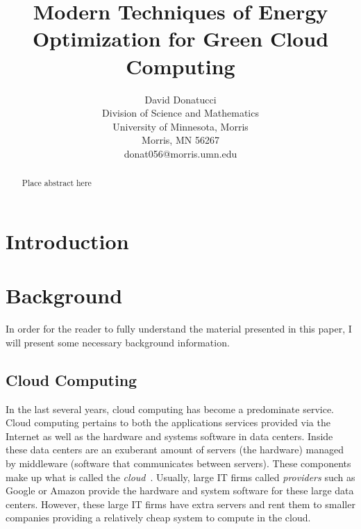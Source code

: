 \documentclass{sig-alternate}
\title{Modern Techniques of Energy Optimization for Green Cloud Computing}
\author{
\alignauthor
 		David Donatucci\\
        Division of Science and Mathematics\\
        University of Minnesota, Morris\\
        Morris, MN 56267\\
        donat056@morris.umn.edu\\
}
\date{}
\begin{document}
\pagestyle{plain}

\maketitle

\begin{abstract}

Place abstract here

\end{abstract}


\section{Introduction} \label{sec:intro}


\section{Background} \label{Background}

In order for the reader to fully understand the material presented in this paper, I will present some necessary background information.

\subsection{Cloud Computing}
\label{sec:Cloud Computing}

In the last several years, cloud computing has become a predominate service. Cloud computing pertains to both the applications services provided via the Internet as well as the hardware and systems software in data centers. Inside these data centers are an exuberant amount of servers (the hardware) managed by middleware (software that communicates between servers). These components make up what is called the \emph{cloud}~\cite{Armbrust}. Usually, large IT firms called \emph{providers} such as Google or Amazon provide the hardware and system software for these large data centers. However, these large IT firms have extra servers and rent them to smaller companies providing a relatively cheap system to compute in the cloud. 
\end{document}
